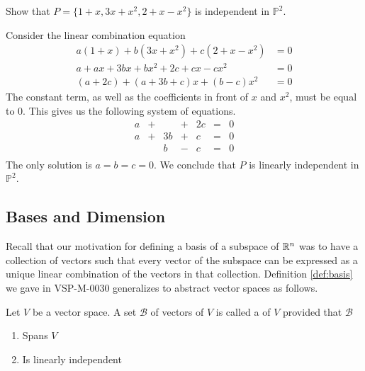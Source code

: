 \documentclass{ximera}
\begin{document}
\begin{example}\label{ex:polyindset} 
Show that $P=\{1 + x, 3x + x^{2}, 2 + x - x^{2}\}$ is independent in $\mathbb{P}^{2}$.

\begin{explanation}
Consider the linear combination equation
\begin{align*}
a(1 + x) + b(3x + x^2) + c(2 + x - x^2) &= 0\\
a+ax+3bx+bx^2+2c+cx-cx^2&=0\\
(a+2c)+(a+3b+c)x+(b-c)x^2&=0
\end{align*}
The constant term, as well as the coefficients in front of $x$ and $x^2$, must be equal to $0$.  This gives us the following system of equations.
\begin{equation*}
\begin{array}{rlrlrcr}
	a & + &      & + & 2c & = & 0 \\
	a & + & 3b & + &  c & = & 0 \\
	    &   &  b & - &  c & = & 0 \\
\end{array}
\end{equation*}
The only solution is $a = b = c = 0$.  We conclude that $P$ is linearly independent in $\mathbb{P}^2$.
\end{explanation}
\end{example}

\subsection*{Bases and Dimension}

Recall that our motivation for defining a basis of a subspace of $\mathbb{R}^n$ was to have a collection of vectors such that every vector of the subspace can be expressed as a unique linear combination of the vectors in that collection.  Definition \ref{def:basis} we gave in VSP-M-0030 generalizes to abstract vector spaces as follows.

\begin{definition}\label{def:basisabstract}
Let $V$ be a vector space.  A set $\mathcal{B}$ of vectors of $V$ is called a  of $V$  provided that $\mathcal{B}$
\begin{enumerate}
\item \label{item:defbasis1abstract}
Spans $V$
\item \label{item:defbasis2abstract}
Is linearly independent
\end{enumerate}
\end{definition}
\end{document}
